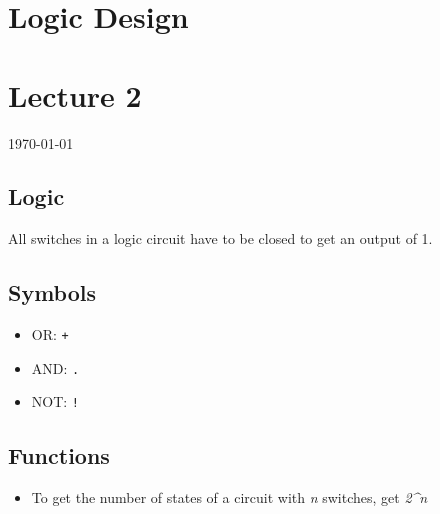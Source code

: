 \documentclass[12pt]{article}
\begin{document}
{\centering
\section*{Logic Design}
\section*{Lecture 2}
\indent\today
}

\subsection*{Logic}
All switches in a logic circuit have to be closed to get an output of 1.

\subsection*{Symbols}
\begin{itemize}
    \item OR: \texttt{+}
    \item AND: \texttt{.}
    \item NOT: \texttt{!}
\end{itemize}

\subsection*{Functions}
\begin{itemize}
    \item To get the number of states of a circuit with \textit{n} switches, get \textit{2^n}
\end{itemize}
\end{document}
